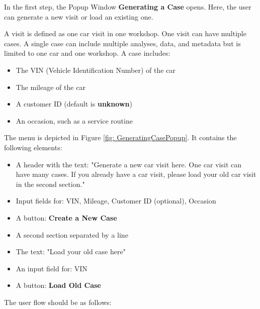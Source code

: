 \documentclass[]{scrreprt}
\begin{document}
In the first step, the Popup Window \textbf{Generating a Case} opens. Here, the user can generate a new visit or load an existing one.


A visit is defined as one car visit in one workshop. One visit can have multiple cases.
A single case can include multiple analyses, data, and metadata but is limited to one car and one workshop. A case includes:
\begin{itemize}
    \item The VIN (Vehicle Identification Number) of the car
    \item The mileage of the car
    \item A customer ID (default is \textbf{unknown})
    \item An occasion, such as a service routine
\end{itemize}


The menu is depicted in Figure \ref{fig: GeneratingCasePopup}. It contains the following elements:
\begin{itemize}
    \item A header with the text: "Generate a new car visit here. One car visit can have many cases. If you already have a car visit, please load your old car visit in the second section."
    \item Input fields for: VIN, Mileage, Customer ID (optional), Occasion
    \item A button: \textbf{Create a New Case}
    \item A second section separated by a line
    \item The text: "Load your old case here"
    \item An input field for: VIN
    \item A button: \textbf{Load Old Case}
\end{itemize}


The user flow should be as follows:
\end{document}

